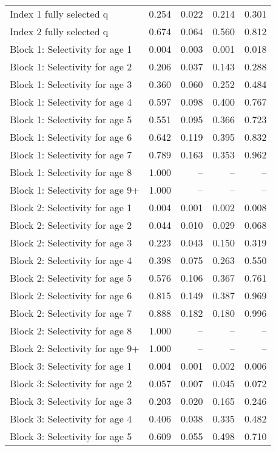 \documentclass[
]{article}
\begin{document}
\begin{landscape}
\begin{longtable}[t]{lrrrr}
\endfoot
\bottomrule
\endlastfoot
Index 1 fully selected q & 0.254 & 0.022 & 0.214 & 0.301\\
Index 2 fully selected q & 0.674 & 0.064 & 0.560 & 0.812\\
Block 1: Selectivity for age 1 & 0.004 & 0.003 & 0.001 & 0.018\\
Block 1: Selectivity for age 2 & 0.206 & 0.037 & 0.143 & 0.288\\
Block 1: Selectivity for age 3 & 0.360 & 0.060 & 0.252 & 0.484\\
\addlinespace
Block 1: Selectivity for age 4 & 0.597 & 0.098 & 0.400 & 0.767\\
Block 1: Selectivity for age 5 & 0.551 & 0.095 & 0.366 & 0.723\\
Block 1: Selectivity for age 6 & 0.642 & 0.119 & 0.395 & 0.832\\
Block 1: Selectivity for age 7 & 0.789 & 0.163 & 0.353 & 0.962\\
Block 1: Selectivity for age 8 & 1.000 & -- & -- & --\\
\addlinespace
Block 1: Selectivity for age 9+ & 1.000 & -- & -- & --\\
Block 2: Selectivity for age 1 & 0.004 & 0.001 & 0.002 & 0.008\\
Block 2: Selectivity for age 2 & 0.044 & 0.010 & 0.029 & 0.068\\
Block 2: Selectivity for age 3 & 0.223 & 0.043 & 0.150 & 0.319\\
Block 2: Selectivity for age 4 & 0.398 & 0.075 & 0.263 & 0.550\\
\addlinespace
Block 2: Selectivity for age 5 & 0.576 & 0.106 & 0.367 & 0.761\\
Block 2: Selectivity for age 6 & 0.815 & 0.149 & 0.387 & 0.969\\
Block 2: Selectivity for age 7 & 0.888 & 0.182 & 0.180 & 0.996\\
Block 2: Selectivity for age 8 & 1.000 & -- & -- & --\\
Block 2: Selectivity for age 9+ & 1.000 & -- & -- & --\\
\addlinespace
Block 3: Selectivity for age 1 & 0.004 & 0.001 & 0.002 & 0.006\\
Block 3: Selectivity for age 2 & 0.057 & 0.007 & 0.045 & 0.072\\
Block 3: Selectivity for age 3 & 0.203 & 0.020 & 0.165 & 0.246\\
Block 3: Selectivity for age 4 & 0.406 & 0.038 & 0.335 & 0.482\\
Block 3: Selectivity for age 5 & 0.609 & 0.055 & 0.498 & 0.710\\

\end{longtable}
\end{landscape}
\end{document}

